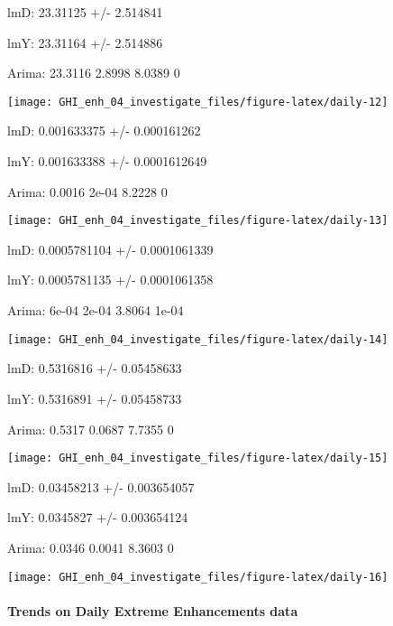 \documentclass[
  10pt,
  a4paper,oneside]{article}
\begin{document}
lmD: 23.31125 +/- 2.514841

lmY: 23.31164 +/- 2.514886

Arima: 23.3116 2.8998 8.0389 0

\begin{center}\texttt{[image: GHI\_enh\_04\_investigate\_files/figure-latex/daily-12]} \end{center}

lmD: 0.001633375 +/- 0.000161262

lmY: 0.001633388 +/- 0.0001612649

Arima: 0.0016 2e-04 8.2228 0

\begin{center}\texttt{[image: GHI\_enh\_04\_investigate\_files/figure-latex/daily-13]} \end{center}

lmD: 0.0005781104 +/- 0.0001061339

lmY: 0.0005781135 +/- 0.0001061358

Arima: 6e-04 2e-04 3.8064 1e-04

\begin{center}\texttt{[image: GHI\_enh\_04\_investigate\_files/figure-latex/daily-14]} \end{center}

lmD: 0.5316816 +/- 0.05458633

lmY: 0.5316891 +/- 0.05458733

Arima: 0.5317 0.0687 7.7355 0

\begin{center}\texttt{[image: GHI\_enh\_04\_investigate\_files/figure-latex/daily-15]} \end{center}

lmD: 0.03458213 +/- 0.003654057

lmY: 0.0345827 +/- 0.003654124

Arima: 0.0346 0.0041 8.3603 0

\begin{center}\texttt{[image: GHI\_enh\_04\_investigate\_files/figure-latex/daily-16]} \end{center}

\newpage

\hypertarget{trends-on-daily-extreme-enhancements-data}{%
\paragraph{Trends on Daily Extreme Enhancements data}\label{trends-on-daily-extreme-enhancements-data}}
\end{document}

